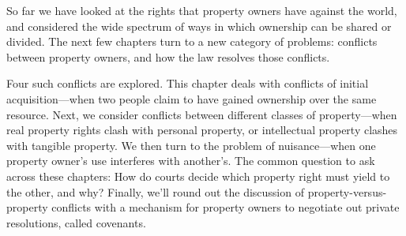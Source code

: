 So far we have looked at the rights that property owners have against the world,
and considered the wide spectrum of ways in which ownership can be shared or
divided. The next few chapters turn to a new category of problems: conflicts
between property owners, and how the law resolves those conflicts.

Four such conflicts are explored. This chapter deals with conflicts of initial
acquisition---when two people claim to have gained ownership over the same
resource. Next, we consider conflicts between different classes of
property---when real property rights clash with personal property, or
intellectual property clashes with tangible property. We then turn to the
problem of nuisance---when one property owner's use interferes with another's.
The common question to ask across these chapters: How do courts decide which
property right must yield to the other, and why? Finally, we'll round out the
discussion of property-versus-property conflicts with a mechanism for property
owners to negotiate out private resolutions, called covenants.


